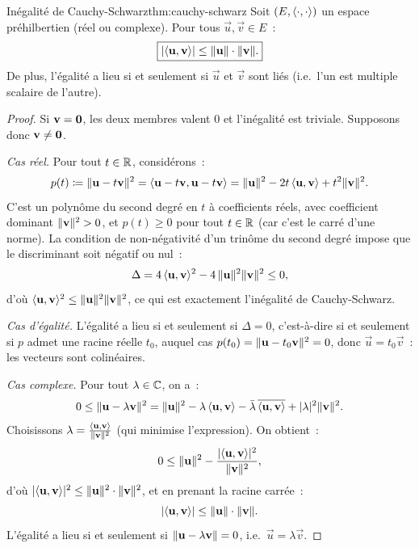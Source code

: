 \begin{theorem}{Inégalité de Cauchy-Schwarz}{thm:cauchy-schwarz}
  Soit $(E,\langle\cdot,\cdot\rangle)$ un espace préhilbertien (réel ou
  complexe). Pour tous $\vec{u},\vec{v}\in E$~:
  \[
    \boxed{\lvert\langle\mathbf{u},\mathbf{v}\rangle\rvert
    \leq\lVert\mathbf{u}\rVert\cdot\lVert\mathbf{v}\rVert.}
  \]
  De plus, l'égalité a lieu si et seulement si $\vec{u}$ et $\vec{v}$
  sont liés (i.e.\ l'un est multiple scalaire de l'autre).
\end{theorem}

\begin{proof}
  Si $\mathbf{v}=\mathbf{0}$, les deux membres valent $0$ et l'inégalité est
  triviale. Supposons donc $\mathbf{v}\neq\mathbf{0}$.

  \emph{Cas réel.} Pour tout $t\in{\mathbb{R}}$, considérons~:
  \[
    p(t)\coloneqq\lVert\mathbf{u}-t\mathbf{v}\rVert^2
    =\langle\mathbf{u}-t\mathbf{v},\mathbf{u}-t\mathbf{v}\rangle
    =\lVert\mathbf{u}\rVert^2-2t\,\langle\mathbf{u},\mathbf{v}\rangle+t^2\lVert\mathbf{v}\rVert^2.
  \]
  C'est un polynôme du second degré en $t$ à coefficients réels, avec
  coefficient dominant $\lVert\mathbf{v}\rVert^2>0$, et $p(t)\geq 0$ pour tout
  $t\in{\mathbb{R}}$ (car c'est le carré d'une norme). La condition de
  non-négativité d'un trinôme du second degré impose que le discriminant
  soit négatif ou nul~:
  \[
    \Delta=4\,\langle\mathbf{u},\mathbf{v}\rangle^2
    -4\,\lVert\mathbf{u}\rVert^2\lVert\mathbf{v}\rVert^2\leq 0,
  \]
  d'où $\langle\mathbf{u},\mathbf{v}\rangle^2\leq\lVert\mathbf{u}\rVert^2\lVert\mathbf{v}\rVert^2$,
  ce qui est exactement l'inégalité de Cauchy-Schwarz.

  \emph{Cas d'égalité.} L'égalité a lieu si et seulement si $\Delta=0$,
  c'est-à-dire si et seulement si $p$ admet une racine réelle $t_0$,
  auquel cas $p(t_0)=\lVert\mathbf{u}-t_0\mathbf{v}\rVert^2=0$, donc
  $\vec{u}=t_0\vec{v}$~: les vecteurs sont colinéaires.

  \emph{Cas complexe.} Pour tout $\lambda\in{\mathbb{C}}$, on a~:
  \[
    0\leq\lVert\mathbf{u}-\lambda\mathbf{v}\rVert^2
    =\lVert\mathbf{u}\rVert^2-\lambda\,\langle\mathbf{u},\mathbf{v}\rangle
    -\bar{\lambda}\,\overline{\langle\mathbf{u},\mathbf{v}\rangle}
    +\lvert\lambda\rvert^2\lVert\mathbf{v}\rVert^2.
  \]
  Choisissons $\lambda=\frac{\langle\mathbf{u},\mathbf{v}\rangle}{\lVert\mathbf{v}\rVert^2}$
  (qui minimise l'expression). On obtient~:
  \[
    0\leq\lVert\mathbf{u}\rVert^2
    -\frac{\lvert\langle\mathbf{u},\mathbf{v}\rangle\rvert^2}{\lVert\mathbf{v}\rVert^2},
  \]
  d'où $\lvert\langle\mathbf{u},\mathbf{v}\rangle\rvert^2
  \leq\lVert\mathbf{u}\rVert^2\cdot\lVert\mathbf{v}\rVert^2$, et en prenant la racine
  carrée~:
  \[
    \lvert\langle\mathbf{u},\mathbf{v}\rangle\rvert\leq\lVert\mathbf{u}\rVert\cdot\lVert\mathbf{v}\rVert.
  \]
  L'égalité a lieu si et seulement si
  $\lVert\mathbf{u}-\lambda\mathbf{v}\rVert=0$, i.e.\
  $\vec{u}=\lambda\vec{v}$.
\end{proof}

